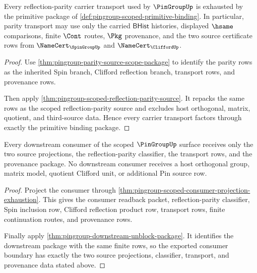 \begin{theorem}
\label{thm:pingroup-parity-scope-transport}
Every reflection-parity carrier transport used by $\PinGroupUp$ is exhausted by
the primitive package of
\autoref{def:pingroup-scoped-primitive-binding}. In particular, parity transport
may use only the carried $\mathsf{BHist}$ histories, displayed $\hsame$
comparisons, finite $\Cont$ routes, $\Pkg$ provenance, and the two source
certificate rows from $\NameCert_{\SpinGroupUp}$ and
$\NameCert_{\CliffordUp}$.
\end{theorem}
\begin{proof}
Use \autoref{thm:pingroup-parity-source-scope-package} to identify the parity
rows as the inherited Spin branch, Clifford reflection branch, transport rows,
and provenance rows.

Then apply \autoref{thm:pingroup-scoped-reflection-parity-source}. It repacks
the same rows as the scoped reflection-parity source and excludes host
orthogonal, matrix, quotient, and third-source data. Hence every carrier
transport factors through exactly the primitive binding package.
\end{proof}

\begin{theorem}
\label{thm:pingroup-consumer-boundary-exhaustion}
Every downstream consumer of the scoped $\PinGroupUp$ surface receives only the
two source projections, the reflection-parity classifier, the transport rows,
and the provenance package. No downstream consumer receives a host orthogonal
group, matrix model, quotient Clifford unit, or additional Pin source row.
\end{theorem}
\begin{proof}
Project the consumer through
\autoref{thm:pingroup-scoped-consumer-projection-exhaustion}. This gives the
consumer readback packet, reflection-parity classifier, Spin inclusion row,
Clifford reflection product row, transport rows, finite continuation routes,
and provenance rows.

Finally apply \autoref{thm:pingroup-downstream-unblock-package}. It identifies
the downstream package with the same finite rows, so the exported consumer
boundary has exactly the two source projections, classifier, transport, and
provenance data stated above.
\end{proof}
